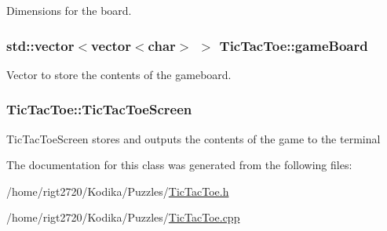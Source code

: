 Dimensions for the board. 

\hypertarget{classTicTacToe_a9e4321945ff098996c42cc56936445b9}{
\subsubsection[{game\-Board}]{\setlength{\rightskip}{0pt plus 5cm}std\-::vector$<$vector$<$char$>$ $>$ Tic\-Tac\-Toe\-::game\-Board\hspace{0.3cm}{\ttfamily [private]}}}\label{classTicTacToe_a9e4321945ff098996c42cc56936445b9}


Vector to store the contents of the gameboard. 

\hypertarget{classTicTacToe_a6749582a8480be3cbae920f8f2cca8ce}{
\subsubsection[{Tic\-Tac\-Toe\-Screen}]{ Tic\-Tac\-Toe\-::\-Tic\-Tac\-Toe\-Screen\hspace{0.3cm}{\ttfamily [private]}}}\label{classTicTacToe_a6749582a8480be3cbae920f8f2cca8ce}
Tic\-Tac\-Toe\-Screen stores and outputs the contents of the game to the terminal 

The documentation for this class was generated from the following files\-:\begin{DoxyCompactItemize}
\item 
/home/rigt2720/\-Kodika/\-Puzzles/\hyperlink{TicTacToe_8h}{Tic\-Tac\-Toe.\-h}\item 
/home/rigt2720/\-Kodika/\-Puzzles/\hyperlink{TicTacToe_8cpp}{Tic\-Tac\-Toe.\-cpp}\end{DoxyCompactItemize}
